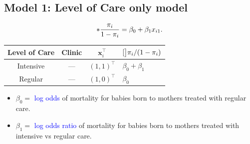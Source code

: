 \documentclass{article}\usepackage[]{graphicx}\usepackage[svgnames]{xcolor}
\let\log\relax%
\providecommand{\Vector}[1]{\bm{#1}}%
\begin{document}
\subsection*{Model 1: Level of Care only model}
\[ \log*{\frac{\pi_i}{1-\pi_i}}=\beta_0+\beta_1x_{i1}. \]
\begin{table}[!htbp]
      \centering
      \begin{tabular}{cccl}
            Level of Care & Clinic & $ \Vector{x}_i^\top $ & $ \log[\big]{\pi_i/(1-\pi_i)} $ \\
            \midrule
            Intensive     & ---    & $ (1,1)^\top $        & $ \beta_0+\beta_1 $             \\
            Regular       & ---    & $ (1,0)^\top $        & $ \beta_0 $                     \\
            \bottomrule
      \end{tabular}
\end{table}
\begin{itemize}
      \item $ \beta_0= $ \textcolor{Blue}{log odds} of mortality for babies born to mothers treated with regular care.
      \item $ \beta_1= $ \textcolor{Blue}{log odds ratio} of mortality for babies born to mothers treated
            with intensive vs regular care.
\end{itemize}
\end{document}
